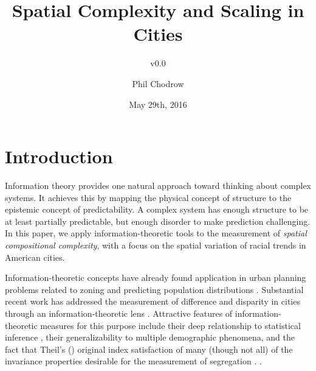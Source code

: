 \documentclass[english]{scrartcl}
\title{Spatial Complexity and Scaling in Cities}
\subtitle{v0.0}
\author{Phil Chodrow}
\date{May 29th, 2016}
\begin{document}
\maketitle


\section{Introduction}

	Information theory provides one natural approach toward thinking about complex systems. It achieves this by mapping the physical concept of structure to the epistemic concept of predictability. A complex system has enough structure to be at least partially predictable, but enough disorder to make prediction challenging. In this paper, we apply information-theoretic tools to the measurement of \emph{spatial compositional complexity}, with a focus on the spatial variation of racial trends in American cities. 

	Information-theoretic concepts have already found application in urban planning problems related to zoning and predicting population distributions \cite{Royal2014,Batty1974,Batty1976,Battya}. Substantial recent work has addressed the measurement of difference and disparity in cities through an information-theoretic lens \cite{Theil1971,Bettencourt2015,Roberto2015a,Roberto2015}. Attractive features of information-theoretic measures for this purpose include their deep relationship to statistical inference \cite{Cover1991,Csiszzr2004}, their generalizability to multiple demographic phenomena, and the fact that Theil's (\cite{Theil1971}) original index satisfaction of many (though not all) of the invariance properties desirable for the measurement of segregation \cite{Reardon2002}. \nocite{Sampson2002,Dietz2002,Wong2004,Keeling1999,Anas1997,Ioannides2004a,Wong1999,Press2009a,Holloway2012,Lee2008,Louf2015}.
\end{document}
